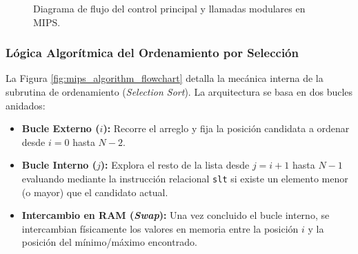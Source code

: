 \documentclass[12pt,a4paper]{article}
\begin{document}
\begin{figure}[H]
\centering
{}
\caption{Diagrama de flujo del control principal y llamadas modulares en MIPS.}
\label{fig:mips_main_flowchart}
\end{figure}

\subsubsection{Lógica Algorítmica del Ordenamiento por Selección}
La Figura \ref{fig:mips_algorithm_flowchart} detalla la mecánica interna de la subrutina de ordenamiento (\textit{Selection Sort}). La arquitectura se basa en dos bucles anidados:
\begin{itemize}[leftmargin=*]
    \item \textbf{Bucle Externo ($i$):} Recorre el arreglo y fija la posición candidata a ordenar desde $i = 0$ hasta $N-2$.
    \item \textbf{Bucle Interno ($j$):} Explora el resto de la lista desde $j = i+1$ hasta $N-1$ evaluando mediante la instrucción relacional \texttt{slt} si existe un elemento menor (o mayor) que el candidato actual.
    \item \textbf{Intercambio en RAM (\textit{Swap}):} Una vez concluido el bucle interno, se intercambian físicamente los valores en memoria entre la posición $i$ y la posición del mínimo/máximo encontrado.
\end{itemize}
\end{document}
